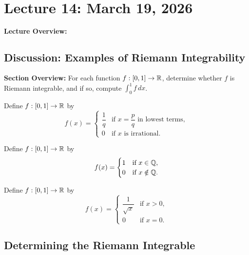 \documentclass[../master/master.tex]{subfiles}
\begin{document}
\renewcommand{\lecturenum}{14}
\renewcommand{\lecturedate}{March 19, 2026}
\renewcommand{\lecturetopic}{Topic}

\section{Lecture \lecturenum : \lecturedate}

\begin{lecturesummary}
\textbf{Lecture Overview:}
\end{lecturesummary}

\subsection{Discussion: Examples of Riemann Integrability}

\begin{summarybox}
\textbf{Section Overview:} For each function $f:[0,1] \to \mathbb{R}$, determine whether $f$ is Riemann integrable, and if so, compute $\int_0^1 f\,dx$.
\end{summarybox}

\begin{example}
Define $f:[0,1] \to \mathbb{R}$ by
\[
f(x) = \begin{cases} \dfrac{1}{q} & \text{if } x = \dfrac{p}{q} \text{ in lowest terms}, \\[6pt] 0 & \text{if } x \text{ is irrational}. \end{cases}
\]
\end{example}

\begin{example}
Define $f:[0,1] \to \mathbb{R}$ by
\[
f(x) = \begin{cases} 1 & \text{if } x \in \mathbb{Q}, \\ 0 & \text{if } x \notin \mathbb{Q}. \end{cases}
\]
\end{example}

\begin{example}
Define $f:[0,1] \to \mathbb{R}$ by
\[
f(x) = \begin{cases} \dfrac{1}{\sqrt{x}} & \text{if } x > 0, \\[6pt] 0 & \text{if } x = 0. \end{cases}
\]
\end{example}

\subsection{Determining the Riemann Integrable}
\end{document}
